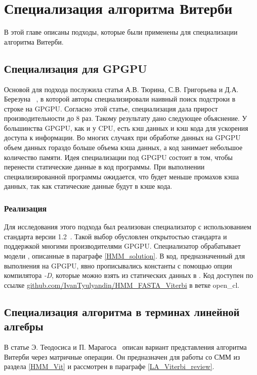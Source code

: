 \section{Специализация алгоритма Витерби}
В этой главе описаны подходы, которые были применены для 
специализации алгоритма Витерби.

\subsection{Специализация для GPGPU}
Основой для подхода послужила статья А.В. Тюрина, 
С.В. Григорьева и Д.А. Березуна ~\cite{part_eval_GPU}, 
в которой авторы специализировали наивный поиск подстроки в 
строке на GPGPU.
Согласно этой статье, специализация дала прирост 
производительности до 8 раз.
Такому результату дано следующее объяснение.
У большинства GPGPU, как и у CPU, есть кэш данных и 
кэш кода для ускорения доступа к информации.
Во многих случаях при обработке данных на GPGPU
объем данных гораздо больше объема кэша данных,
а код занимает небольшое количество памяти.
Идея специализации под GPGPU состоит в том, 
чтобы перенести статические данные в код программы.
При выполнении специализированной программы ожидается, 
что будет меньше промахов кэша данных, так как статические 
данные будут в кэше кода.

\subsubsection{Реализация}
Для исследования этого подхода был реализован специализатор с 
использованием стандарта  версии 
1.2~\cite{OpenCL_spec}.
Такой выбор обусловлен открытостью стандарта и поддержкой 
многими производителями GPGPU.
Специализатор обрабатывает модели ,
описанные в параграфе \ref{HMM_solution}.
В код, предназначенный для выполнения на GPGPU, 
явно прописывались константы с помощью опции компилятора 
 \emph{-D}, 
которые можно взять из статических данных в .
Код доступен по ссылке
\href{https://github.com/IvanTyulyandin/HMM_FASTA_Viterbi/
tree/open_cl}{github.com/IvanTyulyandin/HMM\_FASTA\_Viterbi}
в ветке open\_cl.

\subsection{Специализация алгоритма в терминах линейной алгебры}
В статье Э. Теодосиса и П. Марагоса~\cite{LA_Viterbi} описан 
вариант представления алгоритма Витерби через матричные 
операции.
Он предназначен для работы со СММ из раздела 
\ref{HMM_Vit} и рассмотрен в параграфе 
\ref{LA_Viterbi_review}.


